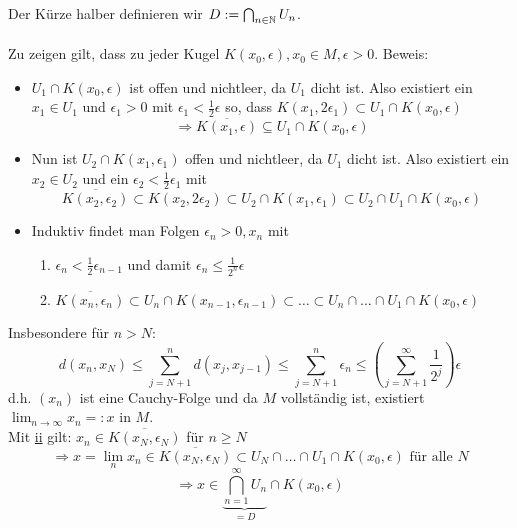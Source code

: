 \begin{beweis}
	Der Kürze halber definieren wir $D := \bigcap_{n \in \mathbb{N}} U_{n}$. \\ \\
	Zu zeigen gilt, dass zu jeder Kugel $K(x_{0}, \epsilon), x_{0} \in M, \epsilon > 0$.
	Beweis: 
	\begin{itemize}
		\item $U_{1} \cap K(x_{0}, \epsilon)$ ist offen und nichtleer, da $U_{1}$ dicht ist. Also existiert ein $x_{1} \in U_{1}$ und $\epsilon_{1} > 0$ mit $\epsilon_{1} < \frac{1}{2} \epsilon$ so, dass $K( x_{1}, 2 \epsilon_{1}) \subset U_{1} \cap K(x_{0}, \epsilon)$
			\[ \Rightarrow \overline{K(x_{1}, \epsilon)} \subseteq U_{1} \cap K(x_{0}, \epsilon) \]
		\item Nun ist $U_{2} \cap K(x_{1}, \epsilon_{1})$  offen und nichtleer, da $U_{1}$ dicht ist. Also existiert ein $x_{2} \in U_{2}$ und ein $\epsilon_{2} < \frac{1}{2} \epsilon_{1}$ mit
			\[ \overline{K(x_{2}, \epsilon_{2})} \subset K(x_{2}, 2 \epsilon_{2}) \subset U_{2} \cap K(x_{1}, \epsilon_{1}) \subset U_{2} \cap U_{1} \cap K(x_{0}, \epsilon) \]
		\item Induktiv findet man Folgen $\epsilon_{n} > 0, x_{n}$ mit
			\begin{enumerate}[label=(\roman*\upshape)]
				\item $\epsilon_{n} < \frac{1}{2} \epsilon_{n - 1}$ und damit $\epsilon_{n} \leq \frac{1}{2^{n}} \epsilon$
				\label{satz:9.1-proof-ii}
				\item $\overline{K(x_{n}, \epsilon_{n})} \subset U_{n} \cap K(x_{n - 1}, \epsilon_{n - 1}) \subset \dotsc \subset U_{n} \cap \dotsc \cap U_{1} \cap K(x_{0}, \epsilon)$
			\end{enumerate}
	\end{itemize}
	Insbesondere für $n > N$:
	\[ d(x_{n}, x_{N}) \leq \sum_{j = N + 1}^{n} d(x_{j}, x_{j - 1}) \leq \sum_{j = N + 1}^{n} \epsilon_{n} \leq \left( \sum_{j = N + 1}^{\infty} \frac{1}{2^{j}} \right) \epsilon \]
	d.h. $(x_{n})$ ist eine Cauchy-Folge und da $M$ vollständig ist, existiert $\lim_{n \rightarrow \infty} x_{n} =: x$ in $M$. \\
	Mit \hyperref[satz:9.1-proof-ii]{ii} gilt: $x_{n} \in \overline{K(x_{N}, \epsilon_{N})}$ für $n \geq N$
	\[ \Rightarrow x = \lim_{n} x_{n} \in \overline{K(x_{N}, \epsilon_{N})} \subset U_{N} \cap \dotsc \cap U_{1} \cap K(x_{0}, \epsilon) \text{ für alle } N \]
	\[ \Rightarrow x \in \underbrace{\bigcap_{n = 1}^{\infty} U_{n}}_{= D} \cap K(x_{0}, \epsilon) \]
\end{beweis}

